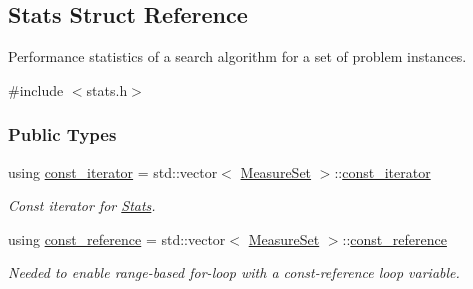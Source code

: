 \hypertarget{structStats}{}\subsection{Stats Struct Reference}
\label{structStats}


Performance statistics of a search algorithm for a set of problem instances.  




{\ttfamily \#include $<$stats.\+h$>$}

\subsubsection*{Public Types}
\begin{DoxyCompactItemize}
\item 
using \hyperlink{structStats_a7dc79881716411ea357945252059a3b7}{const\+\_\+iterator} = std\+::vector$<$ \hyperlink{structMeasureSet}{Measure\+Set} $>$\+::\hyperlink{structStats_a7dc79881716411ea357945252059a3b7}{const\+\_\+iterator}\hypertarget{structStats_a7dc79881716411ea357945252059a3b7}{}\label{structStats_a7dc79881716411ea357945252059a3b7}

\begin{DoxyCompactList}\small\item\em Const iterator for \hyperlink{structStats}{Stats}. \end{DoxyCompactList}\item 
using \hyperlink{structStats_aeff5619cb24d60247ad30f95ee4580f6}{const\+\_\+reference} = std\+::vector$<$ \hyperlink{structMeasureSet}{Measure\+Set} $>$\+::\hyperlink{structStats_aeff5619cb24d60247ad30f95ee4580f6}{const\+\_\+reference}\hypertarget{structStats_aeff5619cb24d60247ad30f95ee4580f6}{}\label{structStats_aeff5619cb24d60247ad30f95ee4580f6}

\begin{DoxyCompactList}\small\item\em Needed to enable range-\/based for-\/loop with a const-\/reference loop variable. \end{DoxyCompactList}\end{DoxyCompactItemize}
